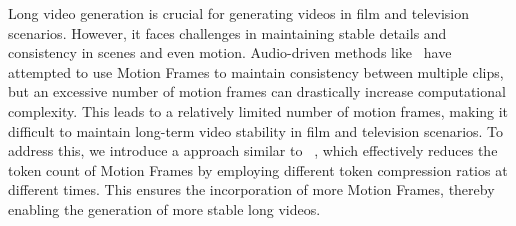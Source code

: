 

Long video generation is crucial for generating videos in film and television scenarios. However, it faces challenges in maintaining stable details and consistency in scenes and even motion. Audio-driven methods like~\cite{tian2024emo} have attempted to use Motion Frames to maintain consistency between multiple clips, but an excessive number of motion frames can drastically increase computational complexity. This leads to a relatively limited number of motion frames, making it difficult to maintain long-term video stability in film and television scenarios. To address this, we introduce a approach similar to ~\cite{zhang2025framepack}, which effectively reduces the token count of Motion Frames by employing different token compression ratios at different times. This ensures the incorporation of more Motion Frames, thereby enabling the generation of more stable long videos.

